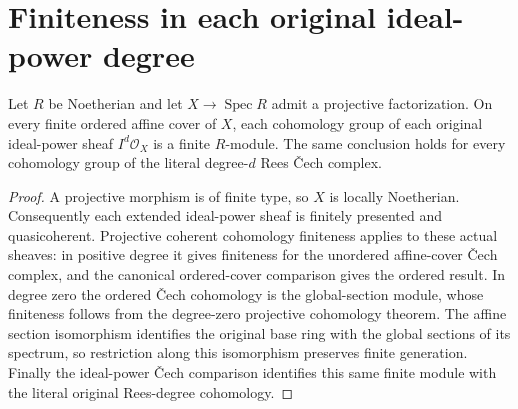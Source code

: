 \section{Finiteness in each original ideal-power degree}

\begin{lemma}
\label{lem:fc-formal-functions-degree-finite}
\leanok
{}
Let $R$ be Noetherian and let $X\to\operatorname{Spec}R$ admit a
projective factorization.  On every finite ordered affine cover of $X$,
each cohomology group of each original ideal-power sheaf $I^d\mathcal O_X$
is a finite $R$-module.  The same conclusion holds for every cohomology
group of the literal degree-$d$ Rees Čech complex.
\end{lemma}
\begin{proof}
A projective morphism is of finite type, so $X$ is locally Noetherian.
Consequently each extended ideal-power sheaf is finitely presented and
quasicoherent.  Projective coherent cohomology finiteness applies to
these actual sheaves: in positive degree it gives finiteness for the
unordered affine-cover Čech complex, and the canonical ordered-cover
comparison gives the ordered result.  In degree zero the ordered Čech
cohomology is the global-section module, whose finiteness follows from
the degree-zero projective cohomology theorem.  The affine section
isomorphism identifies the original base ring with the global sections
of its spectrum, so restriction along this isomorphism preserves finite
generation.  Finally the ideal-power Čech comparison identifies this
same finite module with the literal original Rees-degree cohomology.
\end{proof}
